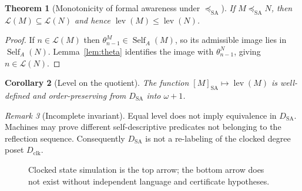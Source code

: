 \documentclass[11pt,letterpaper]{article}
\newtheorem{theorem}{Theorem}[section]
\newtheorem{corollary}[theorem]{Corollary}
\theoremstyle{definition}\newtheorem{definition}[theorem]{Definition}\newtheorem{example}[theorem]{Example}\newtheorem{protocol}[theorem]{Protocol}\newtheorem{question}[theorem]{Open Problem}
\theoremstyle{remark}\newtheorem{remark}[theorem]{Remark}
\newcommand{\Self}{\operatorname{Self}}
\newcommand{\lev}{\operatorname{lev}}
\newcommand{\sas}{\preceq_{\mathrm{SA}}}
\begin{document}
\begin{theorem}[Monotonicity of formal awareness under $\sas$]\label{thm:monotone}
If $M\sas N$, then $\mathcal L(M)\subseteq\mathcal L(N)$ and hence $\lev(M)\le\lev(N)$.
\end{theorem}
\begin{proof}
If $n\in\mathcal L(M)$ then $\theta_{n-1}^M\in\Self_A(M)$, so its admissible image lies in $\Self_A(N)$. Lemma~\ref{lem:theta} identifies the image with $\theta_{n-1}^N$, giving $n\in\mathcal L(N)$.
\end{proof}
\begin{corollary}[Level on the quotient]
The function $[M]_{\mathrm{SA}}\mapsto\lev(M)$ is well-defined and order-preserving from $D_{\mathrm{SA}}$ into $\omega+1$.
\end{corollary}
\begin{remark}[Incomplete invariant]
Equal level does not imply equivalence in $D_{\mathrm{SA}}$. Machines may prove different self-descriptive predicates not belonging to the reflection sequence. Consequently $D_{\mathrm{SA}}$ is not a re-labeling of the clocked degree poset $D_{\mathrm{clk}}$.
\end{remark}

\begin{figure}[htbp]\centering
{}
\caption{Clocked state simulation is the top arrow; the bottom arrow does not exist without independent language and certificate hypotheses.}
\end{figure}
\end{document}
